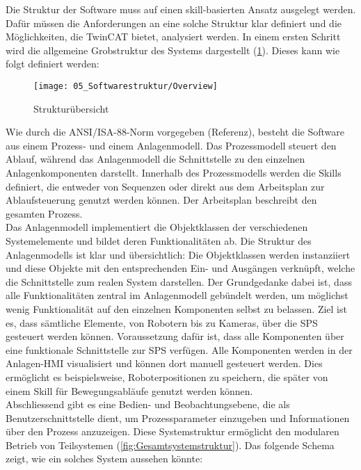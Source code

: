 Die Struktur der Software muss auf einen skill-basierten Ansatz ausgelegt werden. Dafür müssen die Anforderungen an eine solche Struktur klar definiert und die Möglichkeiten, die TwinCAT bietet, analysiert werden. In einem ersten Schritt wird die allgemeine Grobstruktur des Systems dargestellt (\ref{fig:Strukturübersicht}). Dieses kann wie folgt definiert werden: 

\begin{figure}[h!]
	\centering
	\texttt{[image: 05\_Softwarestruktur/Overview]}
	\captionsetup{justification=centering}
	\caption{Strukturübersicht}
	\label{fig:Strukturübersicht}
\end{figure}

Wie durch die ANSI/ISA-88-Norm vorgegeben (Referenz), besteht die Software aus einem Prozess- und einem Anlagenmodell. Das Prozessmodell steuert den Ablauf, während das Anlagenmodell die Schnittstelle zu den einzelnen Anlagenkomponenten darstellt. Innerhalb des Prozessmodells werden die Skills definiert, die entweder von Sequenzen oder direkt aus dem Arbeitsplan zur Ablaufsteuerung genutzt werden können. Der Arbeitsplan beschreibt den gesamten Prozess.
\\
Das Anlagenmodell implementiert die Objektklassen der verschiedenen Systemelemente und bildet deren Funktionalitäten ab. Die Struktur des Anlagenmodells ist klar und übersichtlich: Die Objektklassen werden instanziiert und diese Objekte mit den entsprechenden Ein- und Ausgängen verknüpft, welche die Schnittstelle zum realen System darstellen. Der Grundgedanke dabei ist, dass alle Funktionalitäten zentral im Anlagenmodell gebündelt werden, um möglichst wenig Funktionalität auf den einzelnen Komponenten selbst zu belassen. Ziel ist es, dass sämtliche Elemente, von Robotern bis zu Kameras, über die SPS gesteuert werden können. Voraussetzung dafür ist, dass alle Komponenten über eine funktionale Schnittstelle zur SPS verfügen. Alle Komponenten werden in der Anlagen-HMI visualisiert und können dort manuell gesteuert werden. Dies ermöglicht es beispielsweise, Roboterpositionen zu speichern, die später von einem Skill für Bewegungsabläufe genutzt werden können. 
\\
Abschliessend gibt es eine Bedien- und Beobachtungsebene, die als Benutzerschnittstelle dient, um Prozessparameter einzugeben und Informationen über den Prozess anzuzeigen. Diese Systemstruktur ermöglicht den modularen Betrieb von Teilsystemen (\ref{fig:Gesamtsystemstruktur}). Das folgende Schema zeigt, wie ein solches System aussehen könnte:

